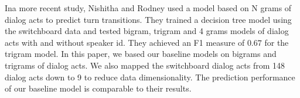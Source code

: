 Ina more recent study, Nishitha and Rodney \cite{SSS1510313} used a model based on N grams of dialog acts to predict turn transitions.
They trained a decision tree model using the switchboard data and tested bigram, trigram and 4 grams models of
dialog acts with and without speaker id. They achieved an F1 measure of $0.67$ for the trigram model.
In this paper, we based our baseline models on bigrams and trigrams of dialog acts.  We also mapped the switchboard dialog acts from 148 dialog acts down to 9 to reduce data dimensionality. The prediction performance of our baseline model is comparable to their results.

